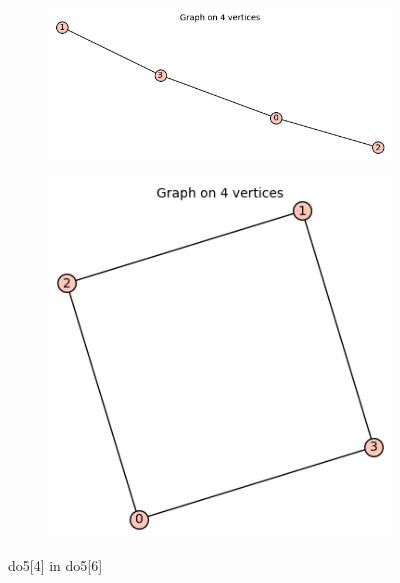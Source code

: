 \documentclass[12pt, a4paper]{article}
\begin{document}
\begin{center}
\begin{figure}
\centering
\begin{subfigure}{0.5\textwidth}
  \centering
  \includegraphics[width=0.6\linewidth]{do5[4]}
\end{subfigure}%
\begin{subfigure}{0.5\textwidth}
  \centering
  \includegraphics[width=0.5\linewidth]{do5[6]}
\end{subfigure}
\caption{do5[4] in do5[6]}
\label{fig:test}
\end{figure}


\end{center}
\end{document}
